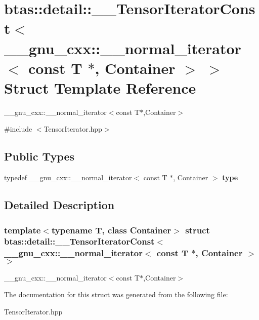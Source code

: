 \hypertarget{structbtas_1_1detail_1_1_____tensor_iterator_const_3_01____gnu__cxx_1_1____normal__iterator_3_011dffa1202a7b6d664a500e6c1813e28f}{
\section{btas::detail::\_\-\_\-TensorIteratorConst$<$ \_\-\_\-gnu\_\-cxx::\_\-\_\-normal\_\-iterator$<$ const T $\ast$, Container $>$ $>$ Struct Template Reference}
\label{structbtas_1_1detail_1_1_____tensor_iterator_const_3_01____gnu__cxx_1_1____normal__iterator_3_011dffa1202a7b6d664a500e6c1813e28f}
}


\_\-\_\-gnu\_\-cxx::\_\-\_\-normal\_\-iterator$<$const T$\ast$,Container$>$  


{\ttfamily \#include $<$TensorIterator.hpp$>$}\subsection*{Public Types}
\begin{DoxyCompactItemize}
\item 
\hypertarget{structbtas_1_1detail_1_1_____tensor_iterator_const_3_01____gnu__cxx_1_1____normal__iterator_3_011dffa1202a7b6d664a500e6c1813e28f_aa08a413c0518f7e10f8d8c456ce45cbf}{
typedef \_\-\_\-gnu\_\-cxx::\_\-\_\-normal\_\-iterator$<$ const T $\ast$, Container $>$ {\bfseries type}}
\label{structbtas_1_1detail_1_1_____tensor_iterator_const_3_01____gnu__cxx_1_1____normal__iterator_3_011dffa1202a7b6d664a500e6c1813e28f_aa08a413c0518f7e10f8d8c456ce45cbf}

\end{DoxyCompactItemize}


\subsection{Detailed Description}
\subsubsection*{template$<$typename T, class Container$>$ struct btas::detail::\_\-\_\-TensorIteratorConst$<$ \_\-\_\-gnu\_\-cxx::\_\-\_\-normal\_\-iterator$<$ const T $\ast$, Container $>$ $>$}

\_\-\_\-gnu\_\-cxx::\_\-\_\-normal\_\-iterator$<$const T$\ast$,Container$>$ 

The documentation for this struct was generated from the following file:\begin{DoxyCompactItemize}
\item 
TensorIterator.hpp\end{DoxyCompactItemize}
